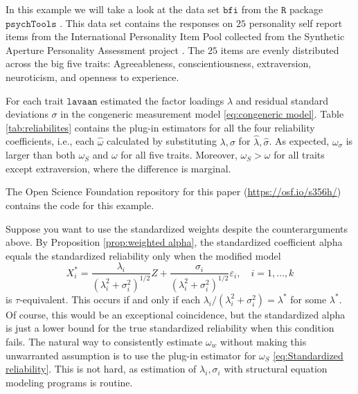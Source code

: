 \documentclass[twoside]{article}
\renewcommand{\sqrt}[1]{{(#1)^{1/2}}}
\begin{document}
\begin{example}
\label{exa:reliabilities}


In this example we will take a look at the data set $\texttt{bfi}$ from the $\texttt{R}$ \citep{Team2013-tt} package $\texttt{psychTools}$ \citep{Revelle2019-te}. This data set contains the responses on $25$ personality self report items from the International Personality Item Pool \citep{Goldberg1999-iz} collected from the Synthetic Aperture Personality Assessment project \citep{Revelle2017-ez}. The $25$ items are evenly distributed across the big five traits: Agreeableness, conscientiousness, extraversion, neuroticism, and openness to experience. 

For each trait $\texttt{lavaan}$ \citep{Rosseel2012-yg} estimated the factor loadings $\lambda$ and residual standard deviations $\sigma$ in the congeneric measurement model \eqref{eq:congeneric model}. Table \ref{tab:reliabilites} contains the plug-in estimators for all the four reliability coefficients, i.e., each $\hat{\omega}$ calculated by substituting $\lambda,\sigma$ for $\hat{\lambda},\hat{\sigma}$. As expected, $\omega_\sigma$ is larger than both $\omega_S$ and $\omega$ for all five traits. Moreover, $\omega_S > \omega$ for all traits except extraversion, where the difference is marginal. 

The Open Science Foundation repository for this paper (\url{https://osf.io/s356h/}) contains the code for this example.
\end{example} 

Suppose you want to use the standardized weights despite the counterarguments above. By Proposition \ref{prop:weighted alpha}, the standardized coefficient alpha equals the standardized reliability only when the modified model
\begin{equation}\label{eq:std-modified model}
X_{i}^{*}=\frac{\lambda_{i}}{\sqrt{\lambda_{i}^{2}+\sigma_{i}^{2}}}Z+\frac{\sigma_{i}}{\sqrt{\lambda_{i}^{2}+\sigma_{i}^{2}}}\varepsilon_{i}, \quad i=1,\ldots,k    \end{equation}
is $\tau$-equivalent. This occurs if and only if each $\lambda_{i}/(\lambda_{i}^{2}+\sigma_{i}^{2})=\lambda^{*}$
for some $\lambda^{*}$. Of course, this would be an exceptional coincidence, but the standardized alpha is just a lower bound for the true standardized reliability when this condition fails. The natural way to consistently estimate $\omega_w$ without making this unwarranted assumption is to use the plug-in estimator for $\omega_S$ \eqref{eq:Standardized reliability}. This is not hard, as estimation of $\lambda_{i},\sigma_{i}$ with structural equation modeling programs is routine. 
\end{document}
